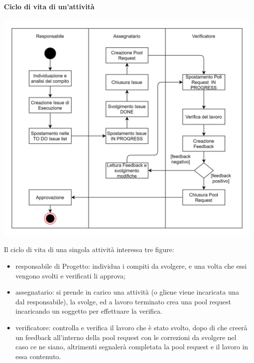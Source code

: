 \paragraph{Ciclo di vita di un'attività}
\begin{center}
    \includegraphics[scale=1.6]{res/images/ciclo_di_vita_ticket.jpg}
\end{center}
Il ciclo di vita di una singola attività interessa tre figure:
\begin{itemize}
    \item responsabile di Progetto: individua i compiti da svolgere, e una volta che essi vengono svolti e verificati li approva;
    \item assegnatario: si prende in carico una attività (o gliene viene incaricata una dal responsabile), la svolge, ed a lavoro terminato crea una pool request incaricando un soggetto per effettuare la verifica.
    \item verificatore: controlla e verifica il lavoro che è stato svolto, dopo di che creerà un feedback all'interno della pool request con le correzioni da svolgere nel caso ce ne siano, altrimenti segnalerà completata la pool request e il lavoro in essa contenuto.
\end{itemize}


